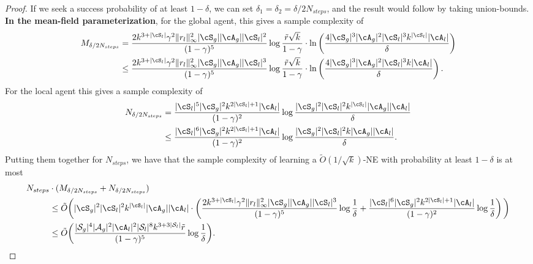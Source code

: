 \documentclass{article}
\theoremstyle{plain}
\theoremstyle{definition}
\begin{document}
\begin{proof}
If we seek a success probability of at least $1-\delta$, we can set $\delta_1 = \delta_2 = \delta/2N_{steps}$, and the result would follow by taking union-bounds.\\

\textbf{In the mean-field parameterization}, for  the global agent, this gives a sample complexity of
\begin{align*}M_{\delta/2N_{steps}} &= \frac{2k^{3+|\cS_l|}\gamma^2\|r_l\|^2_\infty |\cS_g| |\cA_g| |\cS_l|^2}{(1-\gamma)^5}\log \frac{\tilde{r}\sqrt{k}}{1-\gamma} \cdot \ln \left(\frac{4  |\cS_g|^3|\cA_g|^2 |\cS_l|^3 k^{|\cS_l|} |\cA_l|}{\delta}\right) \\
&\leq \frac{2k^{3+|\cS_l|}\gamma^2\|r_l\|^2_\infty |\cS_g| |\cA_g| |\cS_l|^3}{(1-\gamma)^5}\log \frac{\tilde{r}\sqrt{k}}{1-\gamma} \cdot \ln \left(\frac{4  |\cS_g|^3|\cA_g|^2 |\cS_l|^3 k |\cA_l|}{\delta}\right).
\end{align*}
For the local agent this gives a sample complexity of 
\begin{align*}
N_{\delta/2N_{steps}} &= \frac{|\cS_l|^5|\cS_g|^2 k^{2|\cS_l|+1}|\cA_l|}{(1-\gamma)^2} \log \frac{|\cS_g|^2 |\cS_l|^2 k^{|\cS_l|} |\cA_g| |\cA_l|}{\delta} \\
&\leq  \frac{|\cS_l|^6|\cS_g|^2 k^{2|\cS_l|+1}|\cA_l|}{(1-\gamma)^2} \log \frac{|\cS_g|^2 |\cS_l|^2 k  |\cA_g| |\cA_l|}{\delta}.
\end{align*}
Putting them together for $N_{steps}$, we have that the sample complexity of learning a $\tilde{O}(1/\sqrt{k})$-NE with probability at least $1-\delta$ is at most
\begin{align*}
    N_{steps} &\cdot (M_{\delta/2N_{steps}} + N_{\delta/2N_{steps}}) \\
    &\leq \tilde{O}\bigg(|\cS_g|^2 |\cS_l|^2 k^{|\cS_l|} |\cA_g| |\cA_l|\cdot\left(\frac{2k^{3+|\cS_l|}\gamma^2\|r_l\|^2_\infty |\cS_g| |\cA_g| |\cS_l|^3}{(1-\gamma)^5} 
    \log \frac1\delta +  \frac{|\cS_l|^6|\cS_g|^2 k^{2|\cS_l|+1}|\cA_l|}{(1-\gamma)^2} \log \frac1\delta \right)\bigg) \\
    &\leq \tilde{O}\bigg( \frac{|\mathcal{S}_g|^4|\mathcal{A}_g|^2 |\cA_l|^2 |\mathcal{S}_l|^8 k^{3 + 3|\mathcal{S}_l| }\tilde{r}}{(1-\gamma)^5}\log \frac1\delta \bigg).
\end{align*}


\end{proof}
\end{document}
